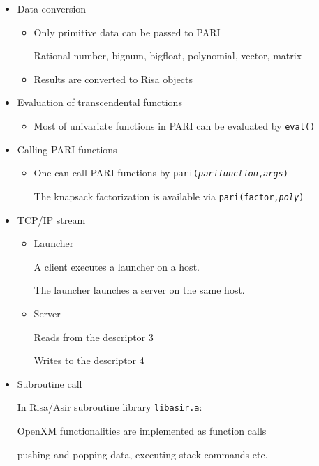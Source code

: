 \documentclass{slides}
\begin{document}
\begin{slide}{}

\begin{itemize}
\item Data conversion

\begin{itemize}

\item Only primitive data can be passed to PARI

Rational number, bignum, bigfloat, polynomial,
vector, matrix

\item Results are converted to Risa objects

\end{itemize}

\item Evaluation of transcendental functions

\begin{itemize}
\item Most of univariate functions in PARI can be 
evaluated by {\tt eval()}
\end{itemize}

\item Calling PARI functions

\begin{itemize}
\item One can call PARI functions by {\tt pari({\it parifunction},{\it args})}

The knapsack factorization is available via {\tt pari(factor,{\it poly})}
\end{itemize}
\end{itemize}
\end{slide}

\begin{slide}{}

\begin{itemize}
\item TCP/IP stream

\begin{itemize}
\item Launcher

A client executes a launcher on a host.

The launcher launches a server on the same host.

\item Server

Reads from the descriptor 3

Writes to the descriptor 4

\end{itemize}

\item Subroutine call

In Risa/Asir subroutine library {\tt libasir.a}:

OpenXM functionalities are implemented as function calls

pushing and popping data, executing stack commands etc.
\end{itemize}
\end{slide}
\end{document}
